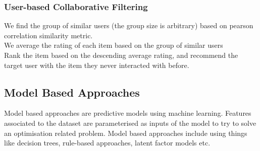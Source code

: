 \subsubsection{User-based Collaborative Filtering}
We find the group of similar users (the group size is arbitrary) based on pearson correlation similarity metric.
\\We average the rating of each item based on the group of similar users
\\Rank the item based on the descending average rating, and recommend the target user with the item they never interacted with before.


\subsection{Model Based Approaches}
Model based approaches are predictive models using machine learning. Features associated to the dataset are parameterised as inputs of the model to try to solve an optimisation related problem. 
Model based approaches include using things like decision trees, rule-based approaches, latent factor models etc.
